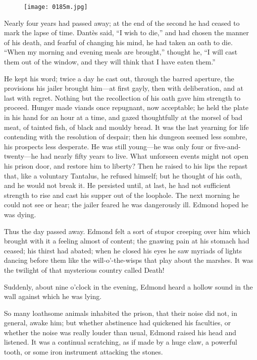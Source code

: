 \begin{figure}[ht]
\texttt{[image: 0185m.jpg]}
\end{figure}

Nearly four years had passed away; at the end of the second he had
ceased to mark the lapse of time. Dantès said, “I wish to die,” and had
chosen the manner of his death, and fearful of changing his mind, he
had taken an oath to die. “When my morning and evening meals are
brought,” thought he, “I will cast them out of the window, and they
will think that I have eaten them.”

He kept his word; twice a day he cast out, through the barred aperture,
the provisions his jailer brought him—at first gayly, then with
deliberation, and at last with regret. Nothing but the recollection of
his oath gave him strength to proceed. Hunger made viands once
repugnant, now acceptable; he held the plate in his hand for an hour at
a time, and gazed thoughtfully at the morsel of bad meat, of tainted
fish, of black and mouldy bread. It was the last yearning for life
contending with the resolution of despair; then his dungeon seemed less
sombre, his prospects less desperate. He was still young—he was only
four or five-and-twenty—he had nearly fifty years to live. What
unforseen events might not open his prison door, and restore him to
liberty? Then he raised to his lips the repast that, like a voluntary
Tantalus, he refused himself; but he thought of his oath, and he would
not break it. He persisted until, at last, he had not sufficient
strength to rise and cast his supper out of the loophole. The next
morning he could not see or hear; the jailer feared he was dangerously
ill. Edmond hoped he was dying.

Thus the day passed away. Edmond felt a sort of stupor creeping over
him which brought with it a feeling almost of content; the gnawing pain
at his stomach had ceased; his thirst had abated; when he closed his
eyes he saw myriads of lights dancing before them like the
will-o’-the-wisps that play about the marshes. It was the twilight of
that mysterious country called Death!

Suddenly, about nine o’clock in the evening, Edmond heard a hollow
sound in the wall against which he was lying.

So many loathsome animals inhabited the prison, that their noise did
not, in general, awake him; but whether abstinence had quickened his
faculties, or whether the noise was really louder than usual, Edmond
raised his head and listened. It was a continual scratching, as if made
by a huge claw, a powerful tooth, or some iron instrument attacking the
stones.

